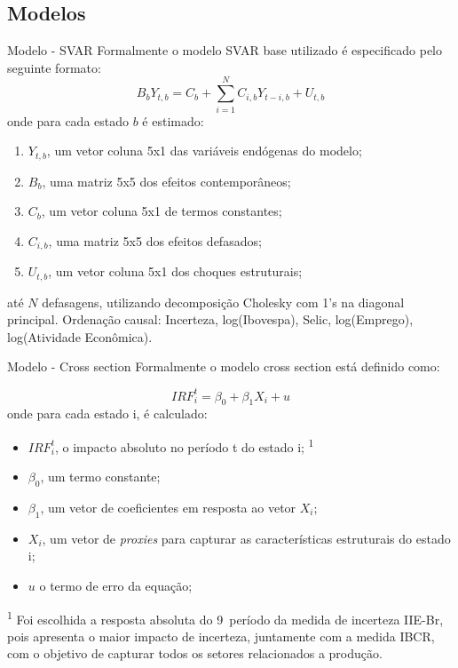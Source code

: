 \documentclass[aspectratio=169, 10pt]{beamer}
\begin{document}
\subsection{Modelos}
\begin{frame}{Modelo - SVAR}
Formalmente o modelo SVAR base utilizado é especificado pelo seguinte
formato:
\begin{equation}
\label{eq:model_1}
    B_{b}Y_{t,b}=C_{b}+\sum_{i=1}^{N} {C_{i,b}Y_{t-i,b}} + U_{t,b}
\end{equation}
onde para cada estado $b$ é estimado:
\begin{enumerate}
    \item[] $Y_{t,b}$, um vetor coluna 5x1 das variáveis endógenas do modelo;
    \item[] $B_{b}$, uma matriz 5x5 dos efeitos contemporâneos;
    \item[] $C_b$, um vetor coluna 5x1 de termos constantes;
    \item[] $C_{i,b}$, uma matriz 5x5 dos efeitos defasados;
    \item[] $U_{t,b}$, um vetor coluna 5x1 dos choques estruturais;
\end{enumerate}
até $N$ defasagens, utilizando decomposição Cholesky com 1's na diagonal principal. 
\newline\newline
Ordenação causal: Incerteza, log(Ibovespa), Selic, log(Emprego), log(Atividade Econômica).
\end{frame}

\begin{frame}{Modelo - Cross section}
Formalmente o modelo cross section está definido como:

\begin{equation}
\label{eq:model_2}
    IRF^{t}_{i} = \beta_{0} + \beta_{1}X_{i} + u
\end{equation}
onde para cada estado i, é calculado:
\begin{itemize}
    \item $IRF^{t}_{i}$, o impacto absoluto no período t do estado i; \textsuperscript{1}
    \item $\beta_{0}$, um termo constante;
    \item $\beta_{1}$, um vetor de coeficientes em resposta ao vetor $X_{i}$;
    \item $X_{i}$,  um vetor de \textit{proxies} para capturar as características estruturais do estado i;
    \item $u$ o termo de erro da equação;
\end{itemize}
\vfill
\tiny \textsuperscript{1} Foi escolhida a resposta absoluta do 9\textordmasculine\ período da medida de incerteza IIE-Br, pois apresenta o maior impacto de incerteza, juntamente com a medida IBCR, com o objetivo de capturar todos os setores relacionados a produção.
\end{frame}
\end{document}

